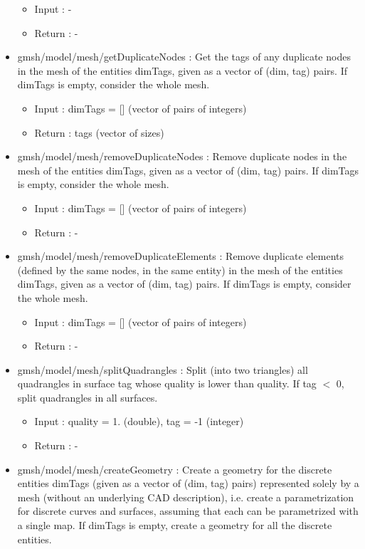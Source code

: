 \documentclass[dvipdfmx, 9pt, a4paper]{article}
\numberwithin{equation}{section}
\begin{document}
\begin{itemize}
\begin{itemize}
\item Input : -
\item Return : -
\end{itemize}
\item gmsh/model/mesh/getDuplicateNodes : Get the tags of any duplicate nodes in the mesh of the entities dimTags, given as a vector of (dim, tag) pairs. If dimTags is empty, consider the whole mesh.
\begin{itemize}
\item Input : dimTags = [] (vector of pairs of integers)
\item Return : tags (vector of sizes)
\end{itemize}
\item gmsh/model/mesh/removeDuplicateNodes : Remove duplicate nodes in the mesh of the entities dimTags, given as a vector of (dim, tag) pairs. If dimTags is empty, consider the whole mesh.
\begin{itemize}
\item Input : dimTags = [] (vector of pairs of integers)
\item Return : -
\end{itemize}
\item gmsh/model/mesh/removeDuplicateElements : Remove duplicate elements (defined by the same nodes, in the same entity) in the
mesh of the entities dimTags, given as a vector of (dim, tag) pairs. If dimTags is
empty, consider the whole mesh.
\begin{itemize}
\item Input : dimTags = [] (vector of pairs of integers)
\item Return : -
\end{itemize}
\item gmsh/model/mesh/splitQuadrangles : Split (into two triangles) all quadrangles in surface tag whose quality is lower than quality. If tag $<$ 0, split quadrangles in all surfaces.
\begin{itemize}
\item Input : quality = 1. (double), tag = -1 (integer)
\item Return : -
\end{itemize}
\item gmsh/model/mesh/createGeometry : Create a geometry for the discrete entities dimTags (given as a vector of (dim, tag) pairs) represented solely by a mesh (without an underlying CAD description), i.e. create a parametrization for discrete curves and surfaces, assuming that each can be parametrized with a single map. If dimTags is empty, create a geometry for all the discrete entities.

\end{itemize}
\end{document}
